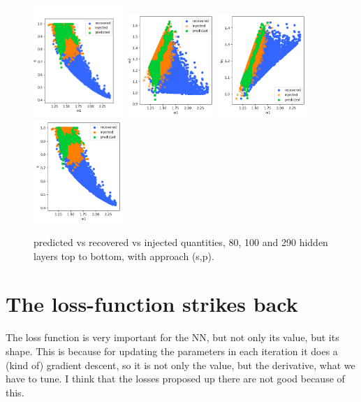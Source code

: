 \documentclass[prd,aps,twocolumn,a4paper,showkeys,nofootinbib]{article}
\begin{document}
\begin{figure}[]
  \includegraphics[width=0.3\textwidth]{./Figs/100_q}
  \includegraphics[width=0.3\textwidth]{./Figs/290_m1m2all}
    \includegraphics[width=0.3\textwidth]{./Figs/290_m1Mcall}
  \includegraphics[width=0.3\textwidth]{./Figs/290_q}
  \caption{\label{fig:approach3_comparison3} predicted vs recovered vs injected quantities, 80, 100 and 290 hidden layers top to bottom, with approach (s,p).}
\end{figure}
\section{The loss-function strikes back}
\label{sec:loss_new}
The loss function is very important for the NN, but not only its value, but its shape. This is because for updating the parameters in each iteration it does a (kind of) gradient descent, so it is not only the value, but the derivative, what we have to tune. I think that the losses proposed up there are not good because of this.
\end{document}
